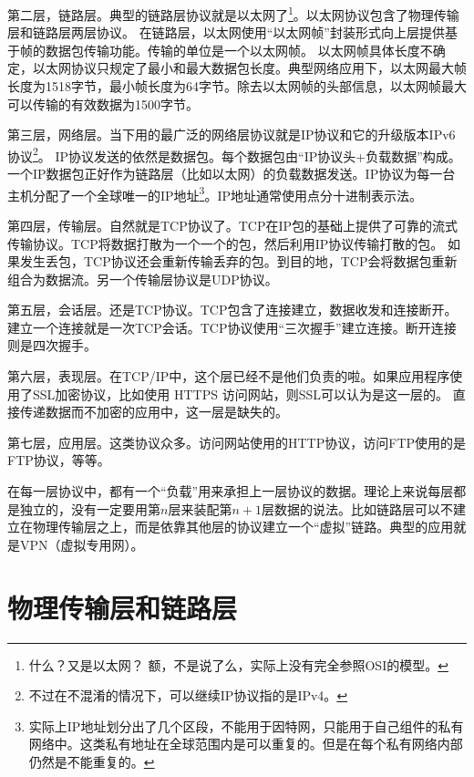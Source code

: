 
第二层，链路层。典型的链路层协议就是以太网了\footnote{什么？又是以太网？ 额，不是说了么，实际上没有完全参照OSI的模型。}。以太网协议包含了物理传输层和链路层两层协议。
在链路层，以太网使用“以太网帧”封装形式向上层提供基于帧的数据包传输功能。传输的单位是一个以太网帧。 以太网帧具体长度不确定，以太网协议只规定了最小和最大数据包长度。典型网络应用下，以太网最大帧长度为1518字节，最小帧长度为64字节。除去以太网帧的头部信息，以太网帧最大可以传输的有效数据为1500字节。

第三层，网络层。当下用的最广泛的网络层协议就是IP协议和它的升级版本IPv6协议\footnote{不过在不混淆的情况下，可以继续IP协议指的是IPv4。}。
IP协议发送的依然是数据包。每个数据包由“IP协议头+负载数据”构成。一个IP数据包正好作为链路层（比如以太网）的负载数据发送。IP协议为每一台主机分配了一个全球唯一的IP地址\footnote{实际上IP地址划分出了几个区段，不能用于因特网，只能用于自己组件的私有网络中。这类私有地址在全球范围内是可以重复的。但是在每个私有网络内部仍然是不能重复的。}。IP地址通常使用点分十进制表示法。

第四层，传输层。自然就是TCP协议了。TCP在IP包的基础上提供了可靠的流式传输协议。TCP将数据打散为一个一个的包，然后利用IP协议传输打散的包。
如果发生丢包，TCP协议还会重新传输丢弃的包。到目的地，TCP会将数据包重新组合为数据流。另一个传输层协议是UDP协议。 %

第五层，会话层。还是TCP协议。TCP包含了连接建立，数据收发和连接断开。建立一个连接就是一次TCP会话。TCP协议使用“三次握手”建立连接。断开连接则是四次握手。

第六层，表现层。在TCP/IP中，这个层已经不是他们负责的啦。如果应用程序使用了SSL加密协议，比如使用 HTTPS 访问网站，则SSL可以认为是这一层的。
直接传递数据而不加密的应用中，这一层是缺失的。

第七层，应用层。这类协议众多。访问网站使用的HTTP协议，访问FTP使用的是FTP协议，等等。

在每一层协议中，都有一个“负载”用来承担上一层协议的数据。理论上来说每层都是独立的，没有一定要用第$n$层来装配第$n+1$层数据的说法。比如链路层可以不建立在物理传输层之上，而是依靠其他层的协议建立一个“虚拟”链路。典型的应用就是VPN（虚拟专用网）。

\section{物理传输层和链路层}

